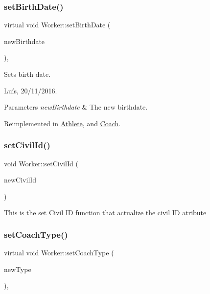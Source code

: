 \subsubsection{\texorpdfstring{set\+Birth\+Date()}{setBirthDate()}}
{\footnotesize\ttfamily virtual void Worker\+::set\+Birth\+Date (\begin{DoxyParamCaption}\item[{\hyperlink{class_date}{Date}}]{new\+Birthdate }\end{DoxyParamCaption})\hspace{0.3cm}{\ttfamily [inline]}, {\ttfamily [virtual]}}



Sets birth date. 

Luís, 20/11/2016. 


\begin{DoxyParams}{Parameters}
{\em new\+Birthdate} & The new birthdate. \\
\hline
\end{DoxyParams}


Reimplemented in \hyperlink{class_athlete_a73fdec76546be945f02cc2b6d90b99ca}{Athlete}, and \hyperlink{class_coach_aef508cef2680594ef837407790d00db6}{Coach}.

\hypertarget{class_worker_ace180f14f1a72e3e018c5ce06c1f3bb3}{}\label{class_worker_ace180f14f1a72e3e018c5ce06c1f3bb3} 
\subsubsection{\texorpdfstring{set\+Civil\+Id()}{setCivilId()}}
{\footnotesize\ttfamily void Worker\+::set\+Civil\+Id (\begin{DoxyParamCaption}\item[{unsigned int}]{new\+Civil\+Id }\end{DoxyParamCaption})}

This is the set Civil ID function that actualize the civil ID atribute \hypertarget{class_worker_ae84b05468a6fdbadad9163bfc18e0569}{}\label{class_worker_ae84b05468a6fdbadad9163bfc18e0569} 
\subsubsection{\texorpdfstring{set\+Coach\+Type()}{setCoachType()}}
{\footnotesize\ttfamily virtual void Worker\+::set\+Coach\+Type (\begin{DoxyParamCaption}\item[{\hyperlink{_utils_8hpp_ad6bce769911d709b802464c1ec12e7ad}{Coach\+Type}}]{new\+Type }\end{DoxyParamCaption})\hspace{0.3cm}{\ttfamily [inline]}, {\ttfamily [virtual]}}



